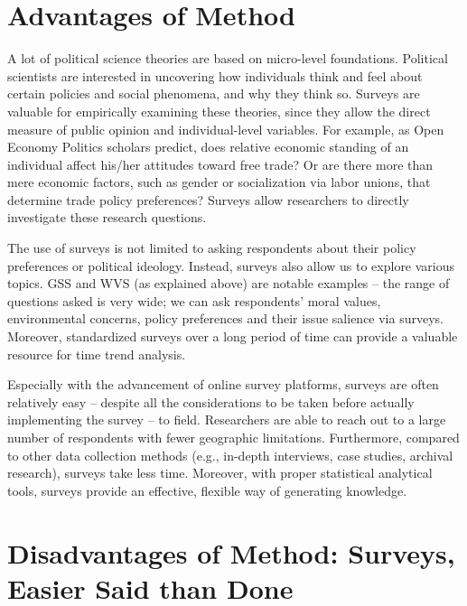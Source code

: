 \documentclass{book}
\begin{document}
\hypertarget{advantages-of-method}{%
\section{Advantages of Method}\label{advantages-of-method}}

A lot of political science theories are based on micro-level foundations.
Political scientists are interested in uncovering how individuals think and
feel about certain policies and social phenomena, and why they think so.
Surveys are valuable for empirically examining these theories, since they
allow the direct measure of public opinion and individual-level variables. For
example, as Open Economy Politics scholars predict, does relative economic
standing of an individual affect his/her attitudes toward free trade? Or are
there more than mere economic factors, such as gender or socialization via
labor unions, that determine trade policy preferences? Surveys allow
researchers to directly investigate these research questions.

The use of surveys is not limited to asking respondents about their policy
preferences or political ideology. Instead, surveys also allow us to explore
various topics. GSS and WVS (as explained above) are notable examples -- the
range of questions asked is very wide; we can ask respondents' moral values,
environmental concerns, policy preferences and their issue salience via
surveys. Moreover, standardized surveys over a long period of time can provide
a valuable resource for time trend analysis.

Especially with the advancement of online survey platforms, surveys are often
relatively easy -- despite all the considerations to be taken before actually
implementing the survey -- to field. Researchers are able to reach out to a
large number of respondents with fewer geographic limitations. Furthermore,
compared to other data collection methods (e.g., in-depth interviews, case
studies, archival research), surveys take less time. Moreover, with proper
statistical analytical tools, surveys provide an effective, flexible way of
generating knowledge.

\hypertarget{disadvantages-of-method-surveys-easier-said-than-done}{%
\section{Disadvantages of Method: Surveys, Easier Said than
Done}\label{disadvantages-of-method-surveys-easier-said-than-done}}
\end{document}
